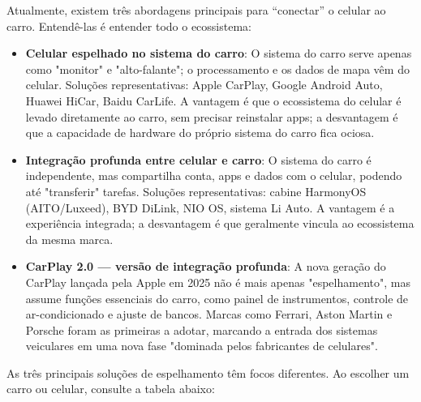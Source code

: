 


Atualmente, existem três abordagens principais para “conectar” o celular ao carro. Entendê-las é entender todo o ecossistema:

\begin{itemize}
  \item \textbf{Celular espelhado no sistema do carro}: O sistema do carro serve apenas como "monitor" e "alto-falante"; o processamento e os dados de mapa vêm do celular. Soluções representativas: Apple CarPlay, Google Android Auto, Huawei HiCar, Baidu CarLife. A vantagem é que o ecossistema do celular é levado diretamente ao carro, sem precisar reinstalar apps; a desvantagem é que a capacidade de hardware do próprio sistema do carro fica ociosa.
  \item \textbf{Integração profunda entre celular e carro}: O sistema do carro é independente, mas compartilha conta, apps e dados com o celular, podendo até "transferir" tarefas. Soluções representativas: cabine HarmonyOS (AITO/Luxeed), BYD DiLink, NIO OS, sistema Li Auto. A vantagem é a experiência integrada; a desvantagem é que geralmente vincula ao ecossistema da mesma marca.
  \item \textbf{CarPlay 2.0 — versão de integração profunda}: A nova geração do CarPlay lançada pela Apple em 2025 não é mais apenas "espelhamento", mas assume funções essenciais do carro, como painel de instrumentos, controle de ar-condicionado e ajuste de bancos. Marcas como Ferrari, Aston Martin e Porsche foram as primeiras a adotar, marcando a entrada dos sistemas veiculares em uma nova fase "dominada pelos fabricantes de celulares".
\end{itemize}


As três principais soluções de espelhamento têm focos diferentes. Ao escolher um carro ou celular, consulte a tabela abaixo:


